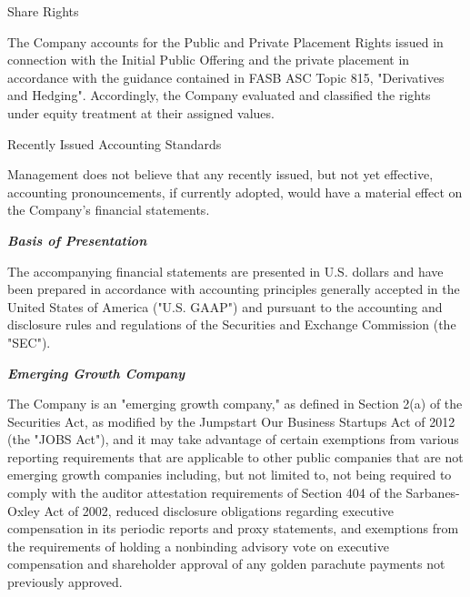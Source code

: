 \documentclass[11pt,a4paper]{article}
\begin{document}
Share Rights

The Company accounts for the Public and Private Placement Rights issued in connection with the Initial Public Offering and the private placement in accordance with the guidance contained in FASB ASC Topic 815, "Derivatives and Hedging". Accordingly, the Company evaluated and classified the rights under equity treatment at their assigned values.

Recently Issued Accounting Standards

Management does not believe that any recently issued, but not yet effective, accounting pronouncements, if currently adopted, would have a material effect on the Company's financial statements.

\textit{\textbf{Basis of Presentation}}

The accompanying financial statements are presented in U.S. dollars and have been prepared in accordance with accounting principles generally accepted in the United States of America ("U.S. GAAP") and pursuant to the accounting and disclosure rules and regulations of the Securities and Exchange Commission (the "SEC").

\textit{\textbf{Emerging Growth Company}}

The Company is an "emerging growth company," as defined in Section 2(a) of the Securities Act, as modified by the Jumpstart Our Business Startups Act of 2012 (the "JOBS Act"), and it may take advantage of certain exemptions from various reporting requirements that are applicable to other public companies that are not emerging growth companies including, but not limited to, not being required to comply with the auditor attestation requirements of Section 404 of the Sarbanes-Oxley Act of 2002, reduced disclosure obligations regarding executive compensation in its periodic reports and proxy statements, and exemptions from the requirements of holding a nonbinding advisory vote on executive compensation and shareholder approval of any golden parachute payments not previously approved.
\end{document}
